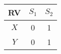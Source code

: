 
\begin{center}
\begin{tabular}{|c|c|c|}
\hline
\textbf{RV} & \textbf{$S_1$} & \textbf{$S_2$} \\ \hline
$X$		   	&   0      & 1\\ \hline
$Y$ 		&	0      & 1\\ \hline
\end{tabular}
\end{center}